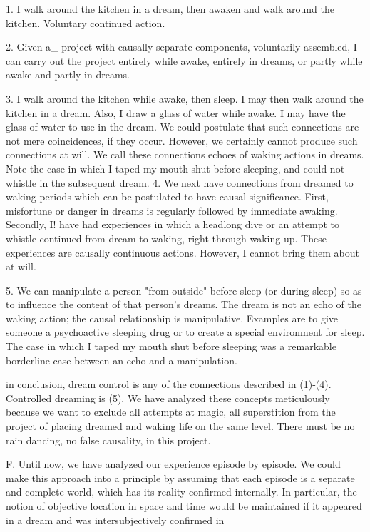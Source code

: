 \documentclass[10pt,twoside]{memoir}
\begin{document}
\begin{enumerate}
{\begin{enumerate}
\begin{sysrules}
\begin{sysrules}
\begin{sysrules}
\begin{sysrules}
{\begin{enumerate}
{{{{{{{1. I walk around the kitchen in a dream, then awaken and walk around the 
kitchen. Voluntary continued action. 

2. Given a_ project with causally separate components, voluntarily 
assembled, I can carry out the project entirely while awake, entirely in 
dreams, or partly while awake and partly in dreams. 

3. I walk around the kitchen while awake, then sleep. I may then walk 
around the kitchen in a dream. Also, I draw a glass of water while awake. I 
may have the glass of water to use in the dream. We could postulate that 
such connections are not mere coincidences, if they occur. However, we 
certainly cannot produce such connections at will. We call these connections 
echoes of waking actions in dreams. Note the case in which I taped my 
mouth shut before sleeping, and could not whistle in the subsequent dream. 
4. We next have connections from dreamed to waking periods which can be 
postulated to have causal significance. First, misfortune or danger in dreams 
is regularly followed by immediate awaking. Secondly, I! have had 
experiences in which a headlong dive or an attempt to whistle continued 
from dream to waking, right through waking up. These experiences are 
causally continuous actions. However, I cannot bring them about at will. 

5. We can manipulate a person "from outside" before sleep (or during sleep) 
so as to influence the content of that person's dreams. The dream is not an 
echo of the waking action; the causal relationship is manipulative. Examples 
are to give someone a psychoactive sleeping drug or to create a special 
environment for sleep. The case in which I taped my mouth shut before 
sleeping was a remarkable borderline case between an echo and a 
manipulation. 

in conclusion, dream control is any of the connections described in 
(1)-(4). Controlled dreaming is (5). We have analyzed these concepts 
meticulously because we want to exclude all attempts at magic, all 
superstition from the project of placing dreamed and waking life on the same 
level. There must be no rain dancing, no false causality, in this project. 

F. Until now, we have analyzed our experience episode by episode. We 
could make this approach into a principle by assuming that each episode is a 
separate and complete world, which has its reality confirmed internally. In 
particular, the notion of objective location in space and time would be 
maintained if it appeared in a dream and was intersubjectively confirmed in 


}}}}}}}
\end{enumerate}}
\end{sysrules}
\end{sysrules}
\end{sysrules}
\end{sysrules}
\end{enumerate}}
\end{enumerate}
\end{document}
